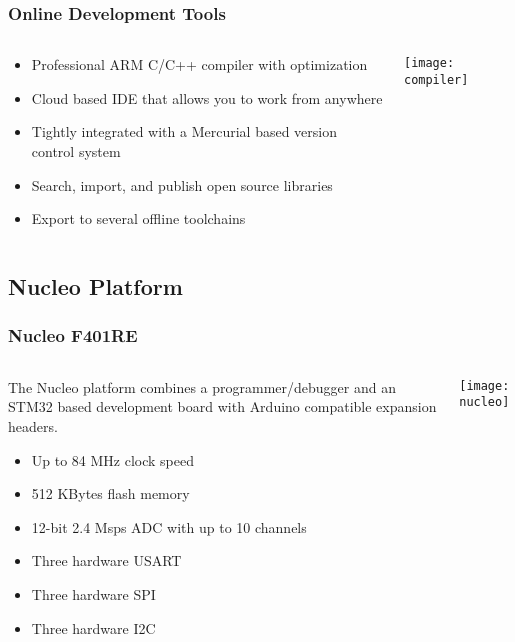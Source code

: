 \begin{frame}[t]
	\frametitle{Online Development Tools}
	\begin{columns}[T]
		\begin{column}{0.5\textwidth}
			\begin{itemize}
				\item Professional ARM C/C++ compiler with optimization
				\item Cloud based IDE that allows you to work from anywhere
				\item Tightly integrated with a Mercurial based version control system
				\item Search, import, and publish open source libraries
				\item Export to several offline toolchains
			\end{itemize}
		\end{column}
		\begin{column}{0.5\textwidth}
			\texttt{[image: compiler]}
		\end{column}
	\end{columns}
\end{frame}

\subsection{Nucleo Platform}
\begin{frame}
	\frametitle{Nucleo F401RE}
	\begin{columns}[T]
		\begin{column}{0.5\textwidth}
			The Nucleo platform combines a programmer/debugger and an STM32 based development board with Arduino compatible expansion headers.
			\begin{itemize}
				\item Up to 84 MHz clock speed
				\item 512 KBytes flash memory
				\item 12-bit 2.4 Msps ADC with up to 10 channels
				\item Three hardware USART
				\item Three hardware SPI
				\item Three hardware I2C
			\end{itemize}
		\end{column}
		\begin{column}{0.5\textwidth}
			\texttt{[image: nucleo]}
		\end{column}
	\end{columns}
\end{frame}

